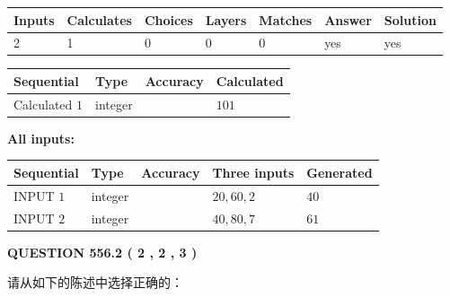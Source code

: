 \documentclass{ctexart}
\begin{document}
 
\noindent{}
 
 

 
   
   
   
   
\noindent\begin{tabular}{|l|l|l|l|l|l|l|}
 \hline
Inputs & Calculates & Choices & Layers & Matches & Answer & Solution \\ \hline
 2  & 
 1  & 
 0
  & 
 0  & 
 0  & 
  yes & 
  yes 
  \\ \hline
 \end{tabular}
   
   
   
   
\noindent{}
   
   
  
  
\noindent\begin{tabular}{|l|l|l|l|}
\hline
 Sequential & Type & Accuracy & Calculated \\ 
\hline
 
 
  Calculated $  1 $ & integer &  & 
  $ 101 $ 
 \\  \hline  
 \end{tabular}
   
   
   
   
\noindent\vspace{0.1in}\hspace{-0.08in} {\textbf{\Large{All inputs: }}}
   
   
  
  
\noindent\begin{tabular}{|l|l|l|l|l|}
\hline
 Sequential & Type & Accuracy & Three inputs & Generated \\ 
\hline
 
 
  INPUT $  1 $ & integer &  & $
 20
 , 
 60
 , 
 2
 $ & $ 40 $ 
 \\  \hline  
 
 
  INPUT $  2 $ & integer &  & $
 40
 , 
 80
 , 
 7
 $ & $ 61 $ 
 \\  \hline  
 \end{tabular}
   
   
  
\vspace{0.2in}
  
{\textbf{\Large{QUESTION
556.2 
 ( 2 , 2 , 3 )
}}}
  
  
请从如下的陈述中选择正确的：
 
\end{document}

